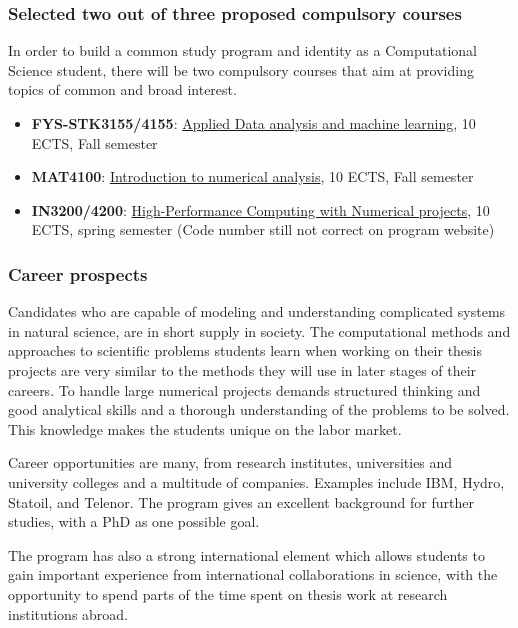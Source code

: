 \documentclass{beamer}
\begin{document}
\begin{frame}
\frametitle{Selected two out of three proposed compulsory courses}

\begin{block}{}
In order to build a common study program and identity as a Computational Science student, there will be two compulsory courses that aim at providing topics of common and broad interest.


\begin{itemize}
\item \textbf{FYS-STK3155/4155}: \href{{https://www.uio.no/studier/emner/matnat/fys/FYS-STK4155/index-eng.html}}{Applied Data analysis and machine learning}, 10 ECTS, Fall semester

\item \textbf{MAT4100}: \href{{https://www.uio.no/studier/emner/matnat/math/MAT4110/index-eng.html}}{Introduction to numerical analysis}, 10 ECTS, Fall semester

\item \textbf{IN3200/4200}: \href{{https://www.uio.no/studier/emner/matnat/ifi/IN3200/index-eng.html}}{High-Performance Computing with Numerical projects}, 10 ECTS, spring semester (Code number still not correct on program website)
\end{itemize}

\noindent
\end{block}
\end{frame}

\begin{frame}
\frametitle{Career prospects}

\begin{block}{}
Candidates who are capable of modeling and understanding complicated
systems in natural science, are in short supply in society.  The
computational methods and approaches to scientific problems students learn
when working on their thesis projects are very similar to the methods
they will use in later stages of their careers.  To handle large
numerical projects demands structured thinking and good analytical
skills and a thorough understanding of the problems to be solved. This
knowledge makes the students unique on the labor market.

Career opportunities are many, from research institutes, universities
and university colleges and a multitude of companies. Examples
include IBM, Hydro, Statoil, and Telenor.  The program gives an
excellent background for further studies, with a PhD as one possible
goal.

The program has also a strong international element which allows students to
gain important experience from international collaborations in
science, with the opportunity to spend parts of the time spent on
thesis work at research institutions abroad.
\end{block}
\end{frame}
\end{document}
